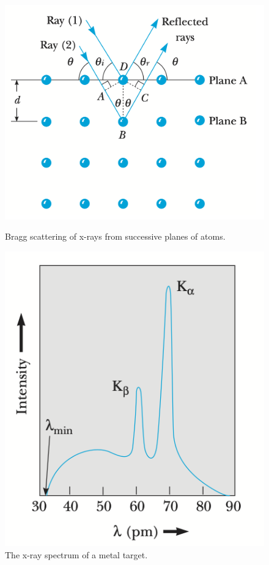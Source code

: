     \begin{figure}
        \includegraphics[width=0.9\linewidth]{figures/x-ray acattering.png}
        \caption{Bragg scattering of x-rays from successive planes of atoms.}
        \label{fig:Bragg scattering}
        \includegraphics[width=0.9\linewidth]{figures/x-ray spectrum.png}
        \caption{The x-ray spectrum of a metal target.}
        \label{fig:x-ray spectrum}
    \end{figure}
    
